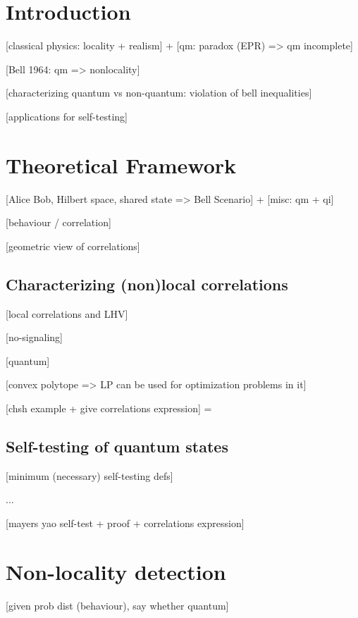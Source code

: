 \setcounter{section}{0}

\setlength{\parindent}{0pt}

\section{Introduction}

[classical physics: locality + realism] + [qm: paradox (EPR) => qm incomplete]

[Bell 1964: qm => nonlocality]

[characterizing quantum vs non-quantum: violation of bell inequalities]

[applications for self-testing]

\section{Theoretical Framework}

[Alice Bob, Hilbert space, shared state => Bell Scenario] + [misc: qm + qi]

[behaviour / correlation]

[geometric view of correlations]

\subsection{Characterizing (non)local correlations}

[local correlations and LHV]

[no-signaling]

[quantum]

[convex polytope => LP can be used for optimization problems in it]

[chsh example + give correlations expression] =

\subsection{Self-testing of quantum states}

[minimum (necessary) self-testing defs]

...

[mayers yao self-test + proof + correlations expression]

\section{Non-locality detection}

[given prob dist (behaviour), say whether quantum]

